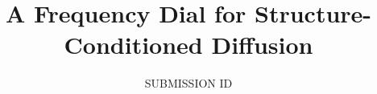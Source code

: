 \documentclass{egpubl}
\title[A Frequency Dial for Structure-Conditioned Diffusion]%
      {A Frequency Dial for Structure-Conditioned Diffusion}
\author[SUBMISSION ID]{SUBMISSION ID}
\begin{document}
\maketitle

\FloatBarrier



\end{document}
